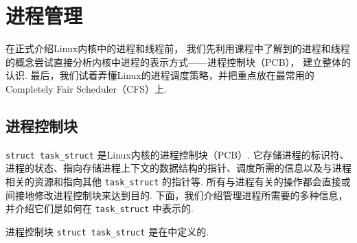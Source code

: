 \section{进程管理}
在正式介绍Linux内核中的进程和线程前，
我们先利用课程中了解到的进程和线程的概念尝试直接分析内核中进程的表示方式——进程控制块（PCB），
建立整体的认识.
最后，我们试着弄懂Linux的进程调度策略，并把重点放在最常用的
Completely Fair Scheduler（CFS）上.

\subsection{进程控制块}
\lstinline{struct task_struct}
是Linux内核的进程控制块（PCB）.
它存储进程的标识符、进程的状态、指向存储进程上下文的数据结构的指针、调度所需的信息以及与进程相关的资源和指向其他 \lstinline{task_struct} 的指针等.
所有与进程有关的操作都会直接或间接地修改进程控制块来达到目的.
下面，我们介绍管理进程所需要的多种信息，并介绍它们是如何在 \lstinline{task_struct} 中表示的.

\begin{readsrcbox}{进程控制块}
	\lstinline{struct task_struct} 是在中定义的.
\end{readsrcbox}

